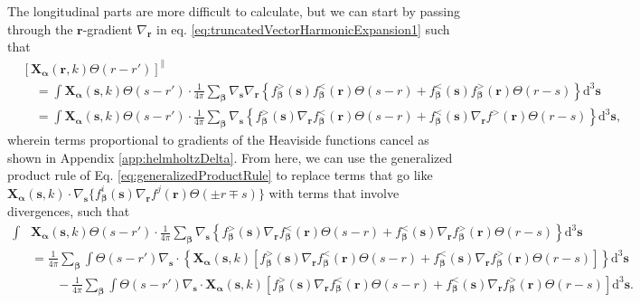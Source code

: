 The longitudinal parts are more difficult to calculate, but we can start by passing through the $\mathbf{r}$-gradient $\nabla_{\mathbf{r}}$ in eq. \eqref{eq:truncatedVectorHarmonicExpansion1} such that
\begin{equation}
\begin{split}
&\left[\mathbf{X}_{\bm{\alpha}}(\mathbf{r},k)\Theta(r - r')\right]^\parallel\\
&\quad = \int\mathbf{X}_{\bm{\alpha}}(\mathbf{s},k)\Theta(s - r')\cdot\frac{1}{4\pi}\sum_{\bm{\beta}}\nabla_{\mathbf{s}}\nabla_{\mathbf{r}}\left\{f_{\bm{\beta}}^>(\mathbf{s}) f_{\bm{\beta}}^<(\mathbf{r})\Theta(s - r) + f_{\bm{\beta}}^<(\mathbf{s})f_{\bm{\beta}}^>(\mathbf{r})\Theta(r - s)\right\}\mathrm{d}^3\mathbf{s}\\
&\quad = \int\mathbf{X}_{\bm{\alpha}}(\mathbf{s},k)\Theta(s - r')\cdot\frac{1}{4\pi}\sum_{\bm{\beta}}\nabla_{\mathbf{s}}\left\{f_{\bm{\beta}}^>(\mathbf{s})\nabla_{\mathbf{r}} f_{\bm{\beta}}^<(\mathbf{r})\Theta(s - r) + f_{\bm{\beta}}^<(\mathbf{s})\nabla_{\mathbf{r}}f^>(\mathbf{r})\Theta(r - s)\right\}\mathrm{d}^3\mathbf{s},
\end{split}
\end{equation}
wherein terms proportional to gradients of the Heaviside functions cancel as shown in Appendix \ref{app:helmholtzDelta}. From here, we can use the generalized product rule of Eq. \eqref{eq:generalizedProductRule} to replace terms that go like $\mathbf{X}_{\bm{\alpha}}(\mathbf{s},k)\cdot\nabla_{\mathbf{s}}\{f_{\bm{\beta}}^i(\mathbf{s})\nabla_{\mathbf{r}}f^j(\mathbf{r})\Theta(\pm r \mp s)\}$ with terms that involve divergences, such that
\begin{equation}
\begin{split}
\int&\mathbf{X}_{\bm{\alpha}}(\mathbf{s},k)\Theta(s - r')\cdot\frac{1}{4\pi}\sum_{\bm{\beta}}\nabla_{\mathbf{s}}\left\{f_{\bm{\beta}}^>(\mathbf{s})\nabla_{\mathbf{r}} f_{\bm{\beta}}^<(\mathbf{r})\Theta(s - r) + f_{\bm{\beta}}^<(\mathbf{s})\nabla_{\mathbf{r}}f_{\bm{\beta}}^>(\mathbf{r})\Theta(r - s)\right\}\mathrm{d}^3\mathbf{s}\\
&= \frac{1}{4\pi}\sum_{\bm{\beta}}\int\Theta(s - r')\nabla_{\mathbf{s}}\cdot\left\{\mathbf{X}_{\bm{\alpha}}(\mathbf{s},k)\left[f_{\bm{\beta}}^>(\mathbf{s})\nabla_{\mathbf{r}}f_{\bm{\beta}}^<(\mathbf{r})\Theta(s - r) + f_{\bm{\beta}}^<(\mathbf{s})\nabla_{\mathbf{r}}f_{\bm{\beta}}^>(\mathbf{r})\Theta(r - s)\right]\right\}\mathrm{d}^3\mathbf{s}\\
&\qquad- \frac{1}{4\pi}\sum_{\bm{\beta}}\int\Theta(s - r')\nabla_{\mathbf{s}}\cdot\mathbf{X}_{\bm{\alpha}}(\mathbf{s},k)\left[f_{\bm{\beta}}^>(\mathbf{s})\nabla_{\mathbf{r}}f_{\bm{\beta}}^<(\mathbf{r})\Theta(s - r) + f_{\bm{\beta}}^<(\mathbf{s})\nabla_{\mathbf{r}}f_{\bm{\beta}}^>(\mathbf{r})\Theta(r - s)\right]\mathrm{d}^3\mathbf{s}.
\end{split}
\end{equation}
